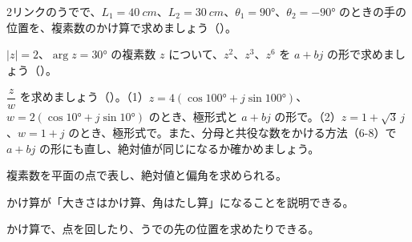 \bkproblem 2リンクのうでで、$L_1=\qty{40}{cm}$、$L_2=\qty{30}{cm}$、$\theta_1=90°$、$\theta_2=-90°$ のときの手の位置を、複素数のかけ算で求めましょう\mbox{（）}。

\bkproblem $|z|=2$、$\arg z=30°$ の複素数 $z$ について、$z^2$、$z^3$、$z^6$ を $a+bj$ の形で求めましょう\mbox{（）}。

\bkproblem $\dfrac{z}{w}$ を求めましょう\mbox{（）}。\newline（1）$z=4(\cos100°+j\sin100°)$、$w=2(\cos10°+j\sin10°)$ のとき、極形式と $a+bj$ の形で。\newline（2）$z=1+\sqrt3\,j$、$w=1+j$ のとき、極形式で。また、分母と共役な数をかける方法（6-8）で $a+bj$ の形にも直し、絶対値が同じになるか確かめましょう。

\begin{furikaeri}
\begin{checklist}
\item 複素数を平面の点で表し、絶対値と偏角を求められる。
\item かけ算が「大きさはかけ算、角はたし算」になることを説明できる。
\item かけ算で、点を回したり、うでの先の位置を求めたりできる。
\end{checklist}
\end{furikaeri}

